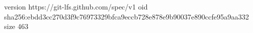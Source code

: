 version https://git-lfs.github.com/spec/v1
oid sha256:ebdd3cc270d3f9c76973329bfca9eccb728e878e9b90037e890ccfe95a9aa332
size 463

